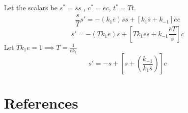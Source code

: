 \documentclass{article}
\theoremstyle{remark}
\newcommand{\newpara}
  {
  \vskip 0.4cm
  }
\begin{document}
\begin{enumerate}[label=(\roman*)]
 
 \newpara
 
 Let the scalars be $s ^{*} = \overline{s}  s$ , $c ^{*} = \overline{e}  c$, $t ^{* } = Tt$. \[
 \frac{\overline{s} }{T}  s'  = - \left( k_{1} \overline{e}  \right) \overline{s}  s + \left[ k_{1} \overline{s}  + k_{-1}  \right] \overline{e}  c
 \] 
 \[
   s'  = - \left(T k_{1} \overline{e}  \right)  s + \left[ Tk_{1} \overline{e} s  + k_{-1} \frac{\overline{e}  T}{\overline{s} }   \right]   c
 \] 
 Let $ \displaystyle Tk_{1} e = 1  \implies  T = \frac{1}{\overline{e}  k_{1}} $ \[
 s'  = -s + \left[ s + \left( \frac{k_{-1}}{k_{1}\overline{s} }  \right) \right] c
 \] 
 
 




\end{enumerate}










\newpage

\section{References}%
\label{sec:references}


  


\end{document}
